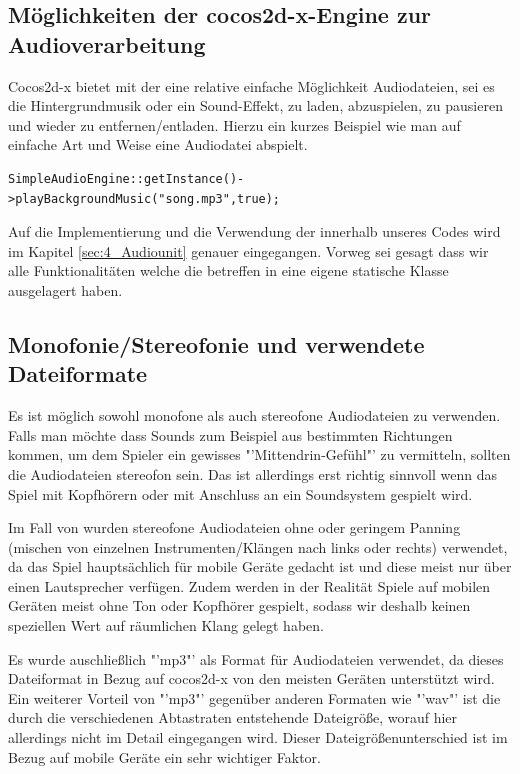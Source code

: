 \subsection{Möglichkeiten der cocos2d-x-Engine zur Audioverarbeitung}
Cocos2d-x bietet mit der  eine relative einfache Möglichkeit Audio\-dateien, sei es die Hintergrundmusik oder ein Sound-Effekt, zu laden, abzuspielen, zu pausieren und wieder zu entfernen/entladen. Hierzu ein kurzes Beispiel wie man auf einfache Art und Weise eine Audiodatei abspielt.

\begin{lstlisting}[style=singleline]
SimpleAudioEngine::getInstance()->playBackgroundMusic("song.mp3",true);
\end{lstlisting}

Auf die Implementierung und die Verwendung der  innerhalb unseres Codes wird im Kapitel \ref{sec:4_Audiounit} genauer eingegangen. Vorweg sei gesagt dass wir alle Funktionalitäten welche die  betreffen in eine eigene statische Klasse  ausgelagert haben.


\subsection{Monofonie/Stereofonie und verwendete Dateiformate}
Es ist möglich sowohl monofone als auch stereofone Audiodateien zu verwenden. Falls man möchte dass Sounds zum Beispiel aus bestimmten Richtungen kommen, um dem Spieler ein gewisses "'Mittendrin-Gefühl"' zu vermitteln, sollten die Audiodateien stereofon sein. Das ist allerdings erst richtig sinnvoll wenn das Spiel mit Kopfhörern oder mit Anschluss an ein Soundsystem gespielt wird. 

Im Fall von \gamename wurden stereofone Audiodateien ohne oder geringem Panning (mischen von einzelnen Instrumenten/Klängen nach links oder rechts) verwendet, da das Spiel hauptsächlich für mobile Geräte gedacht ist und diese meist nur über einen Lautsprecher verfügen. Zudem werden in der Realität Spiele auf mobilen Geräten meist ohne Ton oder Kopfhörer gespielt, sodass wir deshalb keinen speziellen Wert auf räumlichen Klang gelegt haben.

Es wurde auschließlich "'mp3"' als Format für Audiodateien verwendet, da dieses Dateiformat in Bezug auf cocos2d-x von den meisten Geräten unterstützt wird. Ein weiterer Vorteil von "'mp3"' gegenüber anderen Formaten wie "'wav"' ist die durch die verschiedenen Abtastraten entstehende Dateigröße, worauf hier allerdings nicht im Detail eingegangen wird. Dieser Dateigrößenunterschied ist im Bezug auf mobile Geräte ein sehr wichtiger Faktor.

